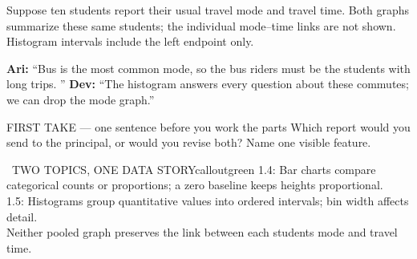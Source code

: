 \documentclass[11pt]{article}
\begin{document}


Suppose ten students report their usual travel mode and travel time. Both graphs summarize these same students; the individual mode--time links are not shown. Histogram intervals include the left endpoint only.\par\smallskip \textbf{Ari:} ``Bus is the most common mode, so the bus riders must be the students with long trips. '' \textbf{Dev:} ``The histogram answers every question about these commutes; we can drop the mode graph.''\par
\begin{center}
\par\smallskip
{}
\end{center}
\begin{firsttakebox}{FIRST TAKE --- one sentence before you work the parts}
Which report would you send to the principal, or would you revise both? Name one visible feature.
\workspace{0.8in}
\end{firsttakebox}

\begin{callout}{\IconBook\ TWO TOPICS, ONE DATA STORY}{calloutgreen}
1.4: Bar charts compare categorical counts or proportions; a zero baseline keeps heights proportional.\\ 1.5: Histograms group quantitative values into ordered intervals; bin width affects detail.\\ Neither pooled graph preserves the link between each student\textquotesingle s mode and travel time.
\end{callout}
\end{document}
